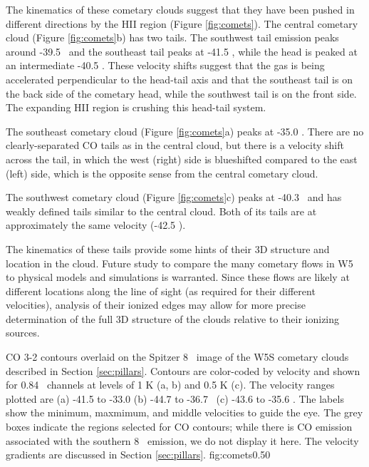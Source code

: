 The kinematics of these cometary clouds suggest that they have been pushed in
different directions by the HII region (Figure \ref{fig:comets}).  The central
cometary cloud (Figure \ref{fig:comets}b) has two tails.  The southwest tail
emission peaks around -39.5 \kms\ and the southeast tail peaks at -41.5 \kms,
while the head is peaked at an intermediate -40.5 \kms.  These velocity shifts
suggest that the gas is being accelerated perpendicular to the head-tail axis
and that the southeast tail is on the back side of the cometary head, while the
southwest tail is on the front side.  The expanding HII region is crushing this
head-tail system.

The southeast cometary cloud (Figure \ref{fig:comets}a) peaks at -35.0 \kms.
There are no clearly-separated CO tails as in the central cloud, but there is a
velocity shift across the tail, in which the west (right) side is blueshifted
compared to the east (left) side, which is the opposite sense from the central
cometary cloud.

The southwest cometary cloud (Figure \ref{fig:comets}c) peaks at -40.3 \kms\
and has weakly defined tails similar to the central cloud.  Both of its tails
are at approximately the same velocity (-42.5 \kms).

The kinematics of these tails provide some hints of their 3D structure and
location in the cloud.  Future study to compare the many cometary flows in W5
to physical models and simulations is warranted.  Since these flows are likely
at different locations along the line of sight (as required for their different
velocities), analysis of their ionized edges may allow for more precise
determination of the full 3D structure of the clouds relative to their ionizing
sources.

{CO 3-2 contours overlaid on the Spitzer 8 \um\ image of the W5S cometary
clouds described in Section \ref{sec:pillars}.  Contours are color-coded by velocity
and shown for 0.84 \kms\ channels at levels of 1 K (a, b) and 0.5 K (c).  The
velocity ranges plotted are (a) -41.5 to -33.0 \kms (b) -44.7 to -36.7 \kms\
(c) -43.6 to -35.6 \kms.  The labels show the minimum, maxmimum, and middle
velocities to guide the eye.  The grey boxes indicate the regions selected for
CO contours; while there is CO emission associated with the southern 8 \um\
emission, we do not display it here. The velocity gradients are discussed in
Section \ref{sec:pillars}.
}
{fig:comets}{0.5}{0}



